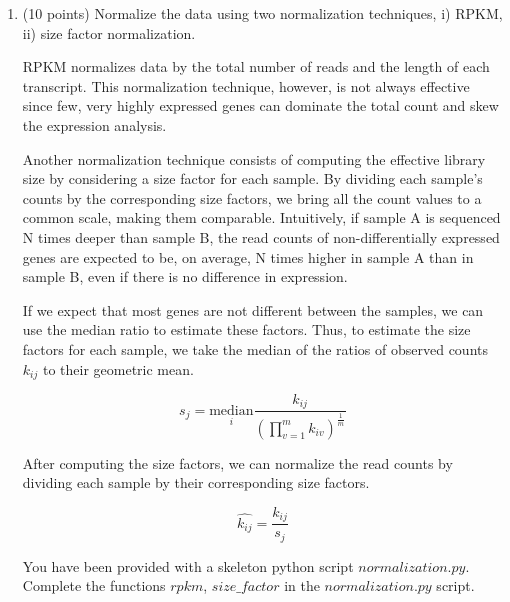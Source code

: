 \begin{enumerate}


\item (10 points) Normalize the data using two normalization techniques, i) RPKM, ii) size factor normalization. 

RPKM normalizes data by the total number of reads and the length of each transcript. This normalization technique, however, is not always effective since few, very highly expressed genes can dominate the total count and skew the expression analysis.

Another normalization technique consists of computing the effective library size by considering a size factor for each sample. By dividing each sample's counts by the corresponding size factors, we bring all the count values to a common scale, making them comparable. Intuitively, if sample A is sequenced N times deeper than sample B, the read counts of non-differentially expressed genes are expected to be, on average, N times higher in sample A than in sample B, even if there is no difference in expression.

If we expect that most genes are not different between the samples, we can use the median ratio to estimate these factors. Thus, to estimate the size factors for each sample, we take the median of the ratios of observed counts $k_{ij}$ to their geometric mean.

$$s_j=\underset{i}{\mathrm{median}} \frac{k_{ij}}{(\prod_{v=1}^{m}k_{iv})^{\frac{1}{m}}}$$


After computing the size factors, we can normalize the read counts by dividing each sample by their corresponding size factors.

$$\hat{k_{ij}}=\frac{k_{ij}}{s_j}$$ 


You have been provided with a skeleton python script $normalization.py$. 
Complete the functions $rpkm$, $size\_factor$  in the $normalization.py$ script.

\vspace{20pt}
 
\vspace{20pt}


\end{enumerate}
